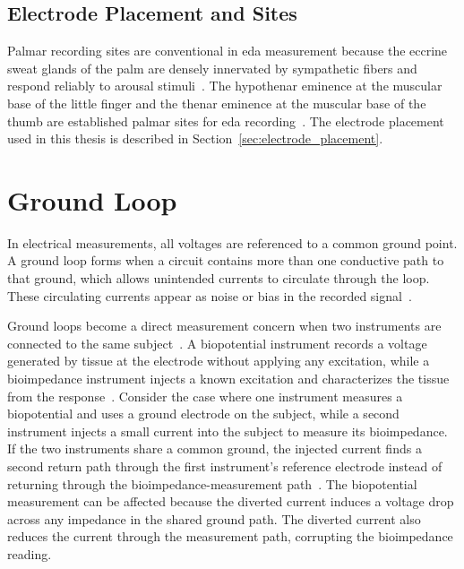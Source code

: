 \subsection{Electrode Placement and Sites}\label{sec:eda_electrode_sites}

Palmar recording sites are conventional in \gls{eda} measurement because the eccrine sweat glands of the palm are densely innervated by sympathetic fibers and respond reliably to arousal stimuli~\cite{boucsein_electrodermal_2012, tronstad_current_2022}. The hypothenar eminence at the muscular base of the little finger and the thenar eminence at the muscular base of the thumb are established palmar sites for \gls{eda} recording~\cite{boucsein_electrodermal_2012, tronstad_current_2022}. The electrode placement used in this thesis is described in Section~\ref{sec:electrode_placement}.


\section{Ground Loop} \label{sec:ground_loops}

In electrical measurements, all voltages are referenced to a common ground point. A ground loop forms when a circuit contains more than one conductive path to that ground, which allows unintended currents to circulate through the loop. These circulating currents appear as noise or bias in the recorded signal~\cite{kamen_essentials_2010}.

Ground loops become a direct measurement concern when two instruments are connected to the same subject~\cite{webster_medical_2020}. A biopotential instrument records a voltage generated by tissue at the electrode without applying any excitation, while a bioimpedance instrument injects a known excitation and characterizes the tissue from the response~\cite{grimnes_bioimpedance_2015}. Consider the case where one instrument measures a biopotential and uses a ground electrode on the subject, while a second instrument injects a small current into the subject to measure its bioimpedance. If the two instruments share a common ground, the injected current finds a second return path through the first instrument's reference electrode instead of returning through the bioimpedance-measurement path~\cite{huhta_60-hz_1973}. The biopotential measurement can be affected because the diverted current induces a voltage drop across any impedance in the shared ground path. The diverted current also reduces the current through the measurement path, corrupting the bioimpedance reading.

